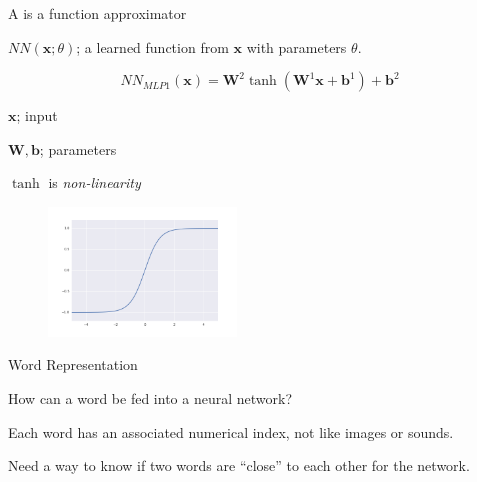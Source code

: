 \documentclass{beamer}
\let\tempone\itemize
\let\temptwo\enditemize
\newcommand{\din}{{d_{\mathrm{in}}}}
\newcommand{\dhid}{{d_{\mathrm{hid}}}}
\newcommand{\dout}{{d_{\mathrm{out}}}}
\renewenvironment{itemize}{\tempone\addtolength{\itemsep}{0.5\baselineskip}}{\temptwo}
\newcommand{\boldx}{\mathbf{x}}
\newcommand{\boldb}{\mathbf{b}}
\newcommand{\boldW}{\mathbf{W}}
\newcommand{\reals}{\ensuremath{\mathbb{R}}}
\begin{document}
\begin{frame}
  A  is a \alert{function approximator}

  
  \begin{itemize}
  \item  $NN(\boldx; \theta)$; a learned function from $\boldx$ with parameters $\theta$.
  \end{itemize}

  \pause

  \[NN_{MLP1}(\boldx) =  \boldW^2 \tanh(\boldW^1 \boldx + \boldb^1) + \boldb^2\]
  \begin{itemize}
  \item $\boldx$; input

  \item $\boldW, \boldb$; parameters
  \item $\tanh$ is \textit{non-linearity} 
  \end{itemize}
  \begin{figure}
    \centering
    \includegraphics[width=5cm]{tanh}     
  \end{figure}

\end{frame}



\begin{frame}{Word Representation}
  \begin{itemize}
  \item How can a word be fed into a neural network?

  \item Each word has an associated numerical index, not like images or 
    sounds.

  \item Need a way to know if two words are ``close'' to each other 
    for the network. 
  \end{itemize}

\end{frame}
\end{document}
